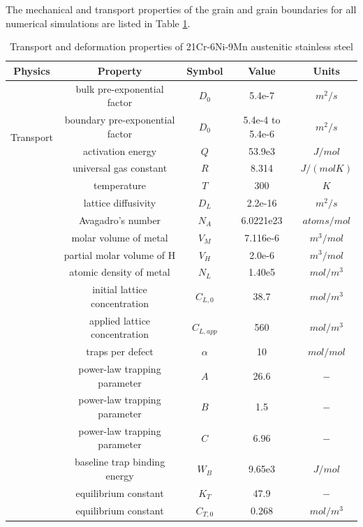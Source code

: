 \documentclass[10pt]{elsarticle}
\begin{document}
The mechanical and transport properties of the grain and grain boundaries for all numerical simulations are listed in Table \ref{tab.material.properties}. 
\begin{table}[h!]
\caption{\label{tab.material.properties}Transport and deformation properties of 21Cr-6Ni-9Mn austenitic stainless steel} \vspace{6pt}
\begin{center}
\begin{tabular}{|c|c|c|c|c|}
\hline
Physics &Property &Symbol &Value &Units\\
\hline
\multirow{5}{*}{Transport} & bulk pre-exponential factor &$D_{0}$ &5.4e-7 &$m^{2}/s$\\
\cline{2-5}
& boundary pre-exponential factor &$D_{0}$ &5.4e-4 to 5.4e-6 &$m^{2}/s$\\
\cline{2-5}
&activation energy &$Q$ &53.9e3 &$J/mol$\\
\cline{2-5}
&universal gas constant &$R$ &8.314 &$J/(mol K)$\\
\cline{2-5}
&temperature &$T$& 300 &$K$\\
\cline{2-5}
&lattice diffusivity &$D_{L}$ &2.2e-16 &${m}^2/s$\\
\cline{2-5}
&Avagadro's number&$N_{A}$ &6.0221e23 &$atoms/mol$\\
\cline{2-5}
&molar volume of metal&$V_{M}$& 7.116e-6 &${m}^3/mol$\\
\cline{2-5}
&partial molar volume of H&$V_{H}$ &2.0e-6 &${m}^3/mol$\\
\cline{2-5}
&atomic density of metal&$N_{L}$ &1.40e5 &$mol/m^{3}$\\
\cline{2-5}
&initial lattice concentration &$C_{L,0}$ &38.7 &$mol/m^{3}$\\
\cline{2-5}
&applied lattice concentration &$C_{L,app}$ &560 &$mol/m^{3}$\\
\cline{2-5}
&traps per defect &$\alpha$ &10 &$mol/mol$\\
\cline{2-5}
&power-law trapping parameter &$A$ &26.6 &$-$\\
\cline{2-5}
&power-law trapping parameter &$B$ &1.5 &$-$\\
\cline{2-5}
&power-law trapping parameter &$C$ &6.96 &$-$\\
\cline{2-5}
&baseline trap binding energy &$W_{B}$ &9.65e3 &$J/mol$\\
\cline{2-5}
&equilibrium constant &$K_{T}$ &47.9&$-$\\
\cline{2-5}
&equilibrium constant &$C_{T,0}$ &0.268&$mol/m^{3}$\\

\end{tabular}
\end{center}
\end{table}
\end{document}
